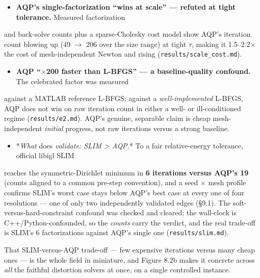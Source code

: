 \documentclass{egpubl}
\begin{document}
\begin{itemize}
  \item \textbf{AQP's single-factorization ``wins at scale'' --- refuted at tight tolerance.} Measured factorization
\end{itemize}
  and back-solve counts plus a sparse-Cholesky cost model show AQP's iteration count blowing up
  (49 $\rightarrow$ 206 over the size range) at tight $\tau$, making it 1.5--2.2$\times$ the cost of mesh-independent Newton
  and rising (\texttt{results/scale\_cost.md}).

\begin{itemize}
  \item \textbf{AQP ``$\times$200 faster than L-BFGS'' --- a baseline-quality confound.} The celebrated factor was measured
\end{itemize}
  against a MATLAB reference L-BFGS; against a \emph{well-implemented} L-BFGS, AQP does not win on raw
  iteration count in either a well- or ill-conditioned regime (\texttt{results/e2.md}). AQP's genuine,
  separable claim is cheap mesh-independent \emph{initial} progress, not raw iterations versus a strong
  baseline.

\begin{itemize}
  \item *\emph{What }does\emph{ validate: SLIM > AQP.}* To a fair relative-energy tolerance, official libigl SLIM \cite{slim}
\end{itemize}
  reaches the symmetric-Dirichlet minimum in \textbf{6 iterations versus AQP's 19} (counts aligned to a
  common pre-step convention), and a seed $\times$ mesh profile confirms SLIM's worst case stays below AQP's
  best case at every one of four resolutions --- one of only two independently validated edges (\S9.1).
  The soft-versus-hard-constraint confound was checked and cleared; the wall-clock is
  C++/Python-confounded, so the \emph{counts} carry the verdict, and the real trade-off is SLIM's 6
  factorizations against AQP's single one (\texttt{results/slim.md}).

That SLIM-versus-AQP trade-off --- few expensive iterations versus many cheap ones --- is the whole field
in miniature, and Figure 8.2b makes it concrete across \emph{all} the faithful distortion solvers at once,
on a single controlled instance.
\end{document}
